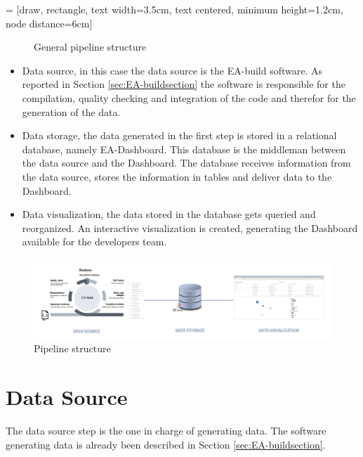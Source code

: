 \documentclass[../main.tex]{subfiles}
\begin{document}
 = [draw, rectangle, text width=3.5cm, text centered, minimum height=1.2cm, node distance=6cm]
\begin{figure}[h]
  \centering
{}
  \caption{General pipeline structure}
  \label{fig:pipelinestructure}
\end{figure}

\begin{itemize}
    \item Data source, in this case the data source is the EA-build software. As reported in Section \ref{sec:EA-buildsection} the software is responsible for the compilation, quality checking and integration of the code and therefor for the generation of the data. 
    \item Data storage, the data generated in the first step is stored in a relational database, namely EA-Dashboard. This database is the middleman between the data source and the Dashboard. The database receives information from the data source, stores the information in tables and deliver data to the Dashboard.
    \item Data visualization, the data stored in the database gets queried and reorganized. An interactive visualization is created, generating the Dashboard available for the developers team.
\end{itemize}
\begin{figure}[h]
    \centering
    \includegraphics[width=\linewidth]{images_folder/pipeline_1.png}
    \caption{Pipeline structure}
    \label{fig:pipeline1}
\end{figure}
\section{Data Source}\label{sec:datasource}
The data source step is the one in charge of generating data. The software generating data is already been described in Section \ref{sec:EA-buildsection}. 
\end{document}
